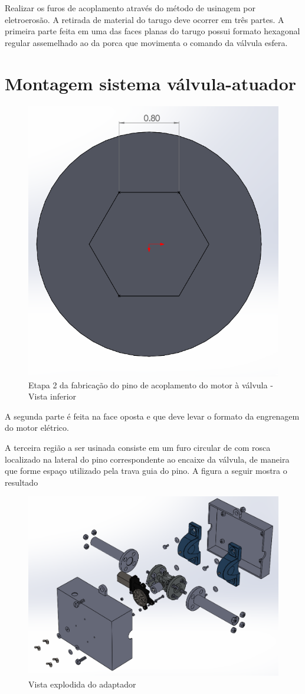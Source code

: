 Realizar os furos de acoplamento através do método de usinagem por eletroerosão. A retirada de material do tarugo deve ocorrer em três partes. A primeira parte feita em uma das faces planas do tarugo possui formato hexagonal regular assemelhado ao da porca que movimenta o comando da válvula esfera. 

\section{Montagem sistema válvula-atuador}

\begin{figure} [H]
    \centering
    \includegraphics[width=.4\textwidth]{Figuras/montagemAbastecimento/pino/etapa2.png}
    \caption{Etapa 2 da fabricação do pino de acoplamento do motor à válvula - Vista inferior}
    \label{fig:pinoetapa2}
\end{figure}

A segunda parte é feita na face oposta e que deve levar o formato da engrenagem do motor elétrico. 

A terceira região a ser usinada consiste em um furo circular de  com rosca localizado na lateral do pino correspondente ao encaixe da válvula, de maneira que forme espaço utilizado pela trava guia do pino. A figura a seguir mostra o resultado

\begin{figure} [H]
    \centering
    \includegraphics[width=1\textwidth]{Figuras/explodida_valvula.png}
    \caption{Vista explodida do adaptador}
\end{figure}

